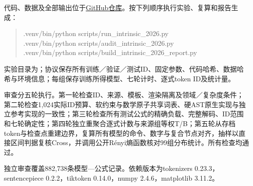 代码、数据及全部输出位于\href{https://github.com/xtr1976536/math-tokenizer-lab}{GitHub仓库}。按下列顺序执行实验、复算和报告生成：
\begin{quote}\small\ttfamily
.venv/bin/python scripts/run\_intrinsic\_2026.py\\
.venv/bin/python scripts/audit\_intrinsic\_2026.py\\
.venv/bin/python scripts/build\_intrinsic\_2026\_report.py
\end{quote}
实验目录为；协议保存所有训练／验证／测试ID、固定参数、代码哈希、数据哈希与环境信息；每组保存训练所得模型、七轮计时、逐式token ID及统计量。

审查分五轮执行。第一轮检查ID、来源、模板、渲染隔离及领域／复杂度条件；第二轮检查1,024实际ID预算、软约束与数学原子共享词表、硬AST原生实现与独立参考实现的一致性；第三轮检查所有测试公式的精确负载、完整解码、ID范围和七轮确定性；第四轮独立重聚合逐式计数与来源组等权T/B；第五轮从存档token与检查点重建边界，复算所有模型的命令、数字与复合节点对齐，抽样以直接区间判据复核Cross，并调用公开Rényi熵函数核对99组分布统计。所有检查均通过。

独立审查覆盖882,738条模型—公式记录。依赖版本为tokenizers 0.23.3，sentencepiece 0.2.2，tiktoken 0.14.0，numpy 2.4.6，matplotlib 3.11.2。

